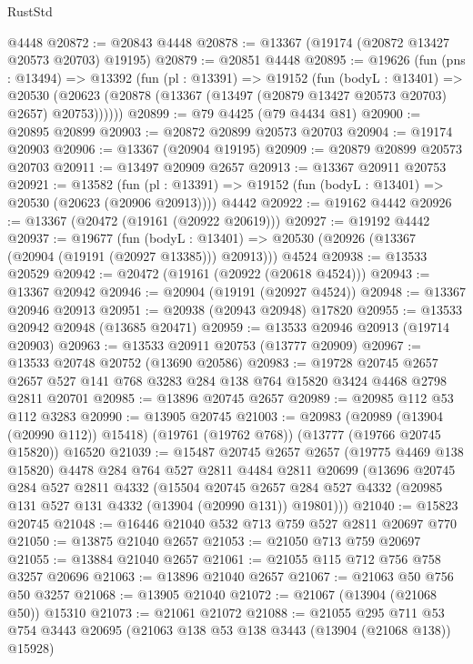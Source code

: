 \begin{lexlean}{RustStd}
\begin{coremodule}
    @4448
@20872 := @20843 @4448
@20878 := @13367 (@19174 (@20872 @13427 @20573 @20703) @19195)
@20879 := @20851 @4448
@20895 := @19626
    (fun (pns : @13494) =>
    @13392
      (fun (pl : @13391) =>
      @19152
        (fun (bodyL : @13401) =>
        @20530 (@20623 (@20878 (@13367 (@13497 (@20879 @13427 @20573 @20703) @2657) @20753))))))
@20899 := @79 @4425 (@79 @4434 @81)
@20900 := @20895 @20899
@20903 := @20872 @20899 @20573 @20703
@20904 := @19174 @20903
@20906 := @13367 (@20904 @19195)
@20909 := @20879 @20899 @20573 @20703
@20911 := @13497 @20909 @2657
@20913 := @13367 @20911 @20753
@20921 := @13582
    (fun (pl : @13391) => @19152 (fun (bodyL : @13401) => @20530 (@20623 (@20906 @20913))))
    @4442
@20922 := @19162 @4442
@20926 := @13367 (@20472 (@19161 (@20922 @20619)))
@20927 := @19192 @4442
@20937 := @19677
    (fun (bodyL : @13401) => @20530 (@20926 (@13367 (@20904 (@19191 (@20927 @13385))) @20913)))
    @4524
@20938 := @13533 @20529
@20942 := @20472 (@19161 (@20922 (@20618 @4524)))
@20943 := @13367 @20942
@20946 := @20904 (@19191 (@20927 @4524))
@20948 := @13367 @20946 @20913
@20951 := @20938 (@20943 @20948) @17820
@20955 := @13533 @20942 @20948 (@13685 @20471)
@20959 := @13533 @20946 @20913 (@19714 @20903)
@20963 := @13533 @20911 @20753 (@13777 @20909)
@20967 := @13533 @20748 @20752 (@13690 @20586)
@20983 := @19728
    @20745
    @2657
    @2657
    @527
    @141
    @768
    @3283
    @284
    @138
    @764
    @15820
    @3424
    @4468
    @2798
    @2811
    @20701
@20985 := @13896 @20745 @2657
@20989 := @20985 @112 @53 @112 @3283
@20990 := @13905 @20745
@21003 := @20983
    (@20989 (@13904 (@20990 @112)) @15418)
    (@19761 (@19762 @768))
    (@13777 (@19766 @20745 @15820))
    @16520
@21039 := @15487
    @20745
    @2657
    @2657
    (@19775 @4469 @138 @15820)
    @4478
    @284
    @764
    @527
    @2811
    @4484
    @2811
    @20699
    (@13696
      @20745
      @284
      @527
      @2811
      @4332
      (@15504
        @20745
        @2657
        @284
        @527
        @4332
        (@20985 @131 @527 @131 @4332 (@13904 (@20990 @131)) @19801)))
@21040 := @15823 @20745
@21048 := @16446 @21040 @532 @713 @759 @527 @2811 @20697 @770
@21050 := @13875 @21040 @2657
@21053 := @21050 @713 @759 @20697
@21055 := @13884 @21040 @2657
@21061 := @21055 @115 @712 @756 @758 @3257 @20696
@21063 := @13896 @21040 @2657
@21067 := @21063 @50 @756 @50 @3257
@21068 := @13905 @21040
@21072 := @21067 (@13904 (@21068 @50)) @15310
@21073 := @21061 @21072
@21088 := @21055
    @295
    @711
    @53
    @754
    @3443
    @20695
    (@21063 @138 @53 @138 @3443 (@13904 (@21068 @138)) @15928)

\end{coremodule}
\end{lexlean}
